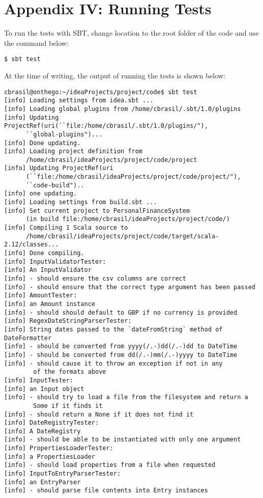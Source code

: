 \section{Appendix IV: Running Tests} \label{appendix4}

To run the tests with SBT, change location to the root folder of the code and
use the command below:
\begin{lstlisting}
$ sbt test
\end{lstlisting}

At the time of writing, the output of running the tests is shown below:
\begin{lstlisting}
cbrasil@onthego:~/ideaProjects/project/code$ sbt test
[info] Loading settings from idea.sbt ...
[info] Loading global plugins from /home/cbrasil/.sbt/1.0/plugins
[info] Updating ProjectRef(uri(``file:/home/cbrasil/.sbt/1.0/plugins/"),
      ``global-plugins")...
[info] Done updating.
[info] Loading project definition from 
      /home/cbrasil/ideaProjects/project/code/project
[info] Updating ProjectRef(uri
      (``file:/home/cbrasil/ideaProjects/project/code/project/"),
      ``code-build")..
[info] one updating.
[info] Loading settings from build.sbt ...
[info] Set current project to PersonalFinanceSystem 
      (in build file:/home/cbrasil/ideaProjects/project/code/)
[info] Compiling 1 Scala source to 
      /home/cbrasil/ideaProjects/project/code/target/scala-2.12/classes...
[info] Done compiling.
[info] InputValidatorTester:
[info] An InputValidator
[info] - should ensure the csv columns are correct
[info] - should ensure that the correct type argument has been passed
[info] AmountTester:
[info] an Amount instance
[info] - should should default to GBP if no currency is provided
[info] RegexDateStringParserTester:
[info] String dates passed to the `dateFromString` method of DateFormatter
[info] - should be converted from yyyy(/.-)dd(/.-)dd to DateTime
[info] - should be converted from dd(/.-)mm(/.-)yyyy to DateTime
[info] - should cause it to throw an exception if not in any
        of the formats above
[info] InputTester:
[info] an Input object
[info] - should try to load a file from the filesystem and return a 
        Some if it finds it
[info] - should return a None if it does not find it
[info] DateRegistryTester:
[info] A DateRegistry
[info] - should be able to be instantiated with only one argument
[info] PropertiesLoaderTester:
[info] a PropertiesLoader
[info] - should load properties from a file when requested
[info] InputToEntryParserTester:
[info] an EntryParser
[info] - should parse file contents into Entry instances

\end{lstlisting}
